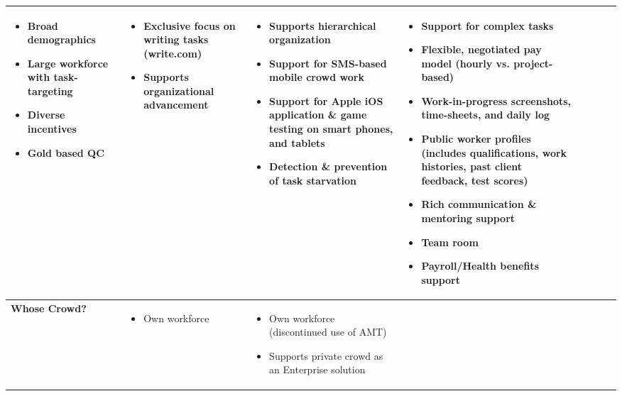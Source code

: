 \documentclass{sigchi}
\begin{document}
\begin{sidewaystable*}
\begin{tabular}[h]{| p{1.5cm}| p{2.7cm}| p{2.7cm}| p{2.7cm}| p{2.7cm}| p{2.7cm}| p{2.7cm}| p{2.7cm}|}
{\begin{itemize} [noitemsep,nolistsep]
\item Broad demographics
\item Large workforce with task-targeting
\item Diverse incentives
\item Gold based QC
\end{itemize}
} & 

{\begin{itemize} [noitemsep,nolistsep]
\item Exclusive focus on writing tasks (write.com)
\item Supports organizational advancement
\end{itemize}
} &

{\begin{itemize} [noitemsep,nolistsep]
\item Supports hierarchical organization
\item Support for SMS-based mobile crowd work 
\item Support for Apple iOS application \& game testing on smart phones, and tablets
\item Detection \& prevention of task starvation
\end{itemize}
} &

{\begin{itemize} [noitemsep,nolistsep]
\item Support for complex tasks
\item Flexible, negotiated pay model (hourly vs. project-based)
\item Work-in-progress screenshots, time-sheets, and daily log
\item Public worker profiles (includes qualifications, work histories, past client feedback, test scores)
\item Rich communication \& mentoring support
\item Team room
\item Payroll/Health benefits support
\end{itemize}
}\\ 

\hline


{
\bf Whose Crowd?
} & 

{\begin{itemize} [noitemsep,nolistsep]
\item Own workforce
\end{itemize}
} &

{
\begin{itemize} [noitemsep,nolistsep]
\item Own workforce (discontinued use of AMT)
\item Supports private crowd as an Enterprise solution
\end{itemize}
} &


\end{tabular}
\end{sidewaystable*}
\end{document}
